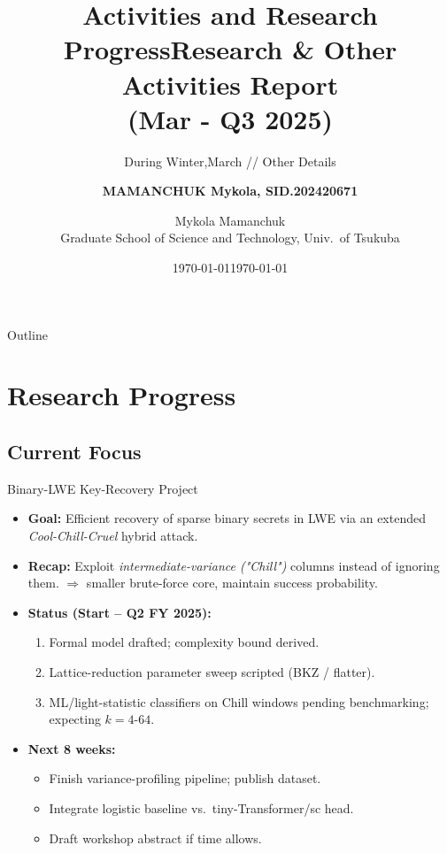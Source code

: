 \documentclass{beamer}
\title[S1]{Activities and Research Progress}
\subtitle{ During Winter,March // Other Details}
\author[Mamanchuk Mykola]{\textbf{MAMANCHUK Mykola, SID.202420671}}
\institute[UoT, CRISEC]{University of Tsukuba \\ Cryptography and Information Security Laboratory}
\date{\today}
\begin{document}
\begin{frame}
  \title{Research \& Other Activities Report \\(Mar - Q3 2025)}
  \author{Mykola Mamanchuk\\Graduate School of Science and Technology, Univ.\ of Tsukuba}
  \date{\today}
  \maketitle
\end{frame}

\begin{frame}{Outline}
  \tableofcontents
\end{frame}

\section{Research Progress}

\subsection{Current Focus}
\begin{frame}{Binary-LWE Key-Recovery Project}
  \begin{itemize}
    \item \textbf{Goal:} Efficient recovery of sparse binary secrets in LWE
          via an extended \textit{Cool-Chill-Cruel} hybrid attack.
    \item \textbf{Recap:} Exploit \emph{intermediate-variance ("Chill")} columns
          instead of ignoring them.  
          \(\Rightarrow\) smaller brute-force core, maintain success probability.
    \item \textbf{Status (Start -- Q2 FY 2025):}
          \begin{enumerate}
            \item Formal model drafted; complexity bound derived.
            \item Lattice-reduction parameter sweep scripted (BKZ / flatter).
            \item ML/light-statistic classifiers on Chill windows pending benchmarking;
                  expecting \(k=4\text{-}64\).
          \end{enumerate}
    \item \textbf{Next 8 weeks:}
          \begin{itemize}
            \item Finish variance-profiling pipeline; publish dataset.
            \item Integrate logistic baseline vs.\ tiny-Transformer/sc head.
            \item Draft workshop abstract if time allows.
          \end{itemize}
  \end{itemize}
\end{frame}
\end{document}
